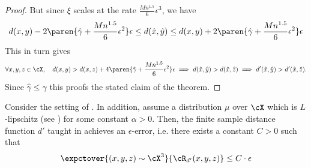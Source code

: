 \begin{proof}
    But since $\xi$ scales at the rate $\frac{Mn^{1.5}}{6}\epsilon^3$, we have 
    \begin{align}
        d(x,y) - 2\paren{\hat{\gamma} + \frac{Mn^{1.5}}{6}\epsilon^2}\epsilon \le d(\hat{x}, \hat{y}) \le  d(x,y) + 2\paren{\hat{\gamma} + \frac{Mn^{1.5}}{6}\epsilon^2}\epsilon
    \end{align}
    This in turn gives
    \begin{align*}
      \forall x,y,z \in \cX,\quad  d(x,y) > d(x,z) + 4\paren{\hat{\gamma} + \frac{Mn^{1.5}}{6}\epsilon^2}\epsilon \implies d(\hat{x},\hat{y}) > d(\hat{x},\hat{z}) \implies d'(\hat{x},\hat{y}) > d'(\hat{x},\hat{z}).
    \end{align*}
    Since $\hat{\gamma} \le \gamma$ this proofs the stated claim of the theorem.
\end{proof}
\begin{corollary}
    Consider the setting of . In addition, assume a distribution $\mu$ over $\cX$ which is $L$-lipschitz (see ) for some constant $\alpha > 0$. %
Then, the finite sample distance function $d'$ taught in  achieves an $\epsilon$-error, i.e. there exists a constant $C > 0$ such that
\begin{align*}
    \expctover{(x,y,z) \sim \cX^3}{\cR_{d'}(x,y,z)} \le C\cdot\epsilon
\end{align*}
\end{corollary}

